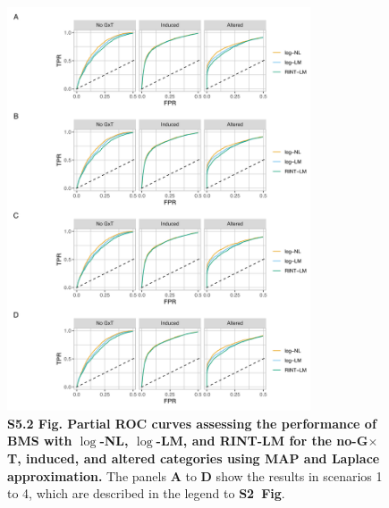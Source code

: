 \documentclass[11pt]{article}
\newcommand{\GxT}{G$\times$T\xspace}
\newcommand{\sfigroccmcmc}{\textbf{S2~Fig}\xspace}
\begin{document}
\begin{figure}[!ht]
\begin{center}
  \includegraphics[width=0.8\textwidth]{png/sim_procc_map_lap.png}
\end{center}  
\caption{
  {\bf
    S5.2 Fig.
    Partial ROC curves assessing the performance of BMS with $\log$-NL, $\log$-LM, and RINT-LM for the no-\GxT, induced, and altered categories using MAP and Laplace approximation.}
The panels \textbf{A} to \textbf{D} show the results in scenarios 1 to 4, which are described in the legend to \sfigroccmcmc.
}
\label{s-fig:sim-procc-map}
\end{figure}
\end{document}
